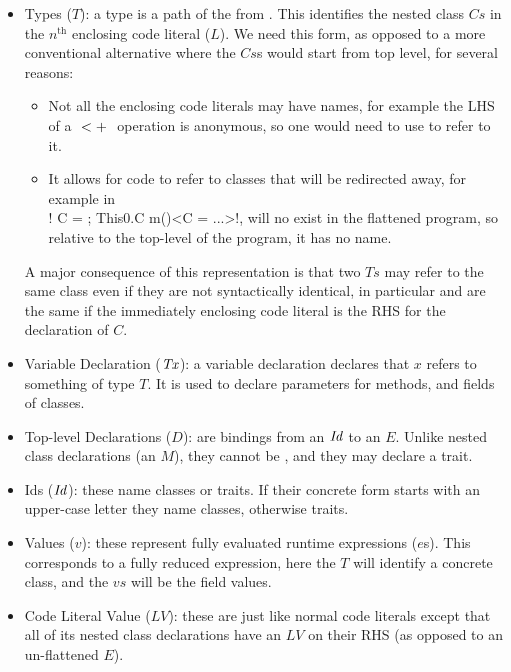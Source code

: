\begin{itemize}
	\item Types ($T$): a type is a path of the from . This identifies the nested class $Cs$ in the $n^\text{th}$ enclosing code literal ($L$). We need this form, as opposed to a more conventional alternative where the $Cs$s would start from top level, for several reasons:
	\begin{itemize}
		\item Not all the enclosing code literals may have names, for example the LHS of a $\summ{}{}$ operation is anonymous, so one would need to use  to refer to it. 
		\item It allows for code to refer to classes that will be redirected away, for example in \\\Q!{ C = {}; This0.C m()}<C = ...>!,  will no exist in the flattened program, so relative to the top-level of the program, it has no name. 
	\end{itemize}
	A major consequence of this representation is that two $Ts$ may refer to the same class even if they are not syntactically identical, in particular  and  are the same if the immediately enclosing code literal is the RHS for the declaration of $C$.
	\item Variable Declaration ($\mathit{Tx}$): a variable declaration declares that $x$ refers to something of type $T$. It is used to declare parameters for methods, and fields of classes.
	\item Top-level Declarations ($D$):  are bindings from an $\mathit{Id}$ to an $E$. Unlike nested class declarations (an $M$), they cannot be , and they may declare a trait. 
	\item Ids ($\mathit{Id}$): these name classes or traits. If their concrete form starts with an upper-case letter they name classes, otherwise traits.
	\item Values ($v$): these represent fully evaluated runtime expressions ($e$s). This corresponds to a fully reduced  expression, here the $T$ will identify a concrete class, and the $vs$ will be the field values.
	\item Code Literal Value ($LV$): these are just like normal code literals except that all of its nested class declarations have an $LV$ on their RHS (as opposed to an un-flattened $E$).
\end{itemize}

